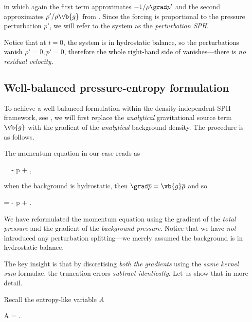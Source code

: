 \documentclass[../main.tex]{subfiles}
\begin{document}
in which again the first term approximates $ - 1/\rho \grad p'$ and the second approximates $\rho'/\rho \vb{g}$ from . Since the forcing is proportional to the pressure perturbation $p'$, we will refer to the system  as the \emph{perturbation SPH}.

Notice that at $t = 0$, the system is in hydrostatic balance, so the perturbations vanish $\rho' = 0, p' = 0$, therefore the whole right-hand side of  vanishes---there is \emph{no residual velocity.}

\subsection{Well-balanced pressure-entropy formulation}
\label{sec:WB-DI-PA}

To achieve a well-balanced formulation within the density-independent SPH framework, see , we will first replace the \emph{analytical} gravitational source term $\vb{g}$ with the gradient of the \emph{analytical} background density. The procedure is as follows.

The momentum equation in our case reads as

\begin{equations}[single,*]
	 = -  \grad p + ,
\end{equations}

when the background is hydrostatic, then $\grad \overline{p} = \vb{g} \overline{\rho}$ and so

\begin{equations}[single,!,numberline=all]
	\label{eq:WB-INSPIRATION}
	 = -  \grad p +  \grad {}.
\end{equations}

We have reformulated the momentum equation using the gradient of the \emph{total pressure} and the gradient of the \emph{background pressure}. Notice that we have \emph{not} introduced any perturbation splitting---we merely assumed the background is in hydrostatic balance. 

The key insight is that by discretising \emph{both the gradients} using the \emph{same kernel sum} formulae, the truncation errors \emph{subtract identically}. Let us show that in more detail.

Recall the entropy-like variable $A$ 

\begin{equations}[single,*]
	A = .
\end{equations}
\end{document}
